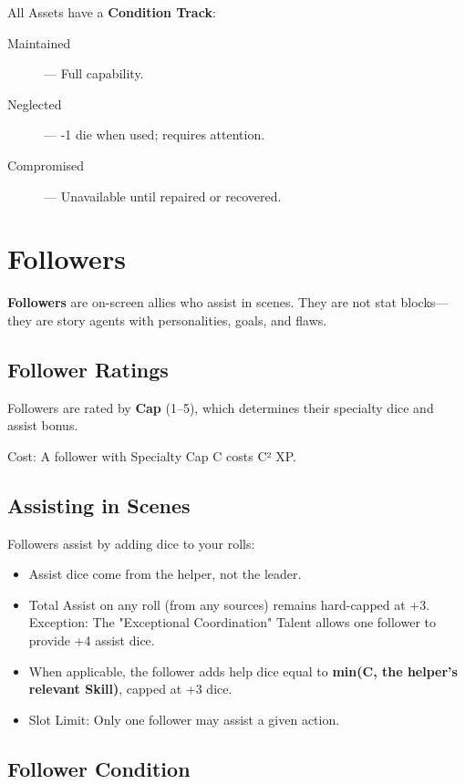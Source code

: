 All Assets have a \textbf{Condition Track}:

\begin{description}
  \item[Maintained] — Full capability.
  \item[Neglected] — -1 die when used; requires attention.
  \item[Compromised] — Unavailable until repaired or recovered.
\end{description}

\section{Followers}

\textbf{Followers} are on-screen allies who assist in scenes. They are not stat blocks—they are story agents with personalities, goals, and flaws.

\subsection*{Follower Ratings}

Followers are rated by \textbf{Cap} (1–5), which determines their specialty dice and assist bonus.

Cost: A follower with Specialty Cap C costs C² XP.

\subsection*{Assisting in Scenes}

Followers assist by adding dice to your rolls:

\begin{itemize}
  \item Assist dice come from the helper, not the leader.
  \item Total Assist on any roll (from any sources) remains hard-capped at +3. Exception: The "Exceptional Coordination" Talent allows one follower to provide +4 assist dice.
  \item When applicable, the follower adds help dice equal to \textbf{min(C, the helper's relevant Skill)}, capped at +3 dice.
  \item Slot Limit: Only one follower may assist a given action.
\end{itemize}

\subsection*{Follower Condition}

